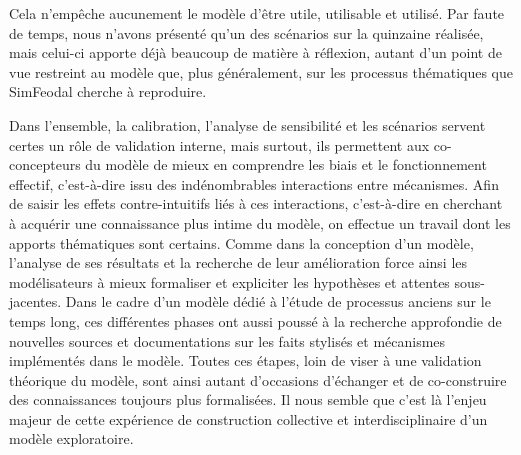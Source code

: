 Cela n'empêche aucunement le modèle d'être utile, utilisable et utilisé.
Par faute de temps, nous n'avons présenté qu'un des scénarios sur la quinzaine réalisée, mais celui-ci apporte déjà beaucoup de matière à réflexion, autant d'un point de vue restreint au modèle que, plus généralement, sur les processus thématiques que SimFeodal cherche à reproduire.

Dans l'ensemble, la calibration, l'analyse de sensibilité et les scénarios servent certes un rôle de validation interne, mais surtout, ils permettent aux co-concepteurs du modèle de mieux en comprendre les biais et le fonctionnement effectif, c'est-à-dire issu des indénombrables interactions entre mécanismes.
Afin de saisir les effets contre-intuitifs liés à ces interactions, c'est-à-dire en cherchant à acquérir une connaissance plus intime du modèle, on effectue un travail dont les apports thématiques sont certains.
Comme dans la conception d'un modèle, l'analyse de ses résultats et la recherche de leur amélioration force ainsi les modélisateurs à mieux formaliser et expliciter les hypothèses et attentes sous-jacentes.
Dans le cadre d'un modèle dédié à l'étude de processus anciens sur le temps long, ces différentes phases ont aussi poussé à la recherche approfondie de nouvelles sources et documentations sur les faits stylisés et mécanismes implémentés dans le modèle.
Toutes ces étapes, loin de viser à une validation théorique du modèle, sont ainsi autant d'occasions d'échanger et de co-construire des connaissances toujours plus formalisées.
Il nous semble que c'est là l'enjeu majeur de cette expérience de construction collective et interdisciplinaire d'un modèle exploratoire.
